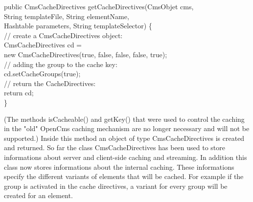 \begin{java}
public  CmsCacheDirectives getCacheDirectives(CmsObjet cms,\\
\jtabb		String templateFile, String elementName,\\
\jtabb 		Hashtable parameters, String templateSelector) \{\\
\jtaba 		// create a CmsCacheDirectives object:\\
\jtaba 		CmsCacheDirectives cd = \\
\jtabb 			new CmsCacheDirectives(true, false, false, false, true);\\
\jtaba		// adding the group to the cache key:\\
\jtaba		cd.setCacheGroups(true);\\
\jtaba		// return the CacheDirectives:\\
\jtaba		return cd;\\
\}\\
\end{java}


(The methods {\meth isCacheable()}  
and {\meth getKey()} that were used to control the caching in 
the "old" OpenCms caching mechanism are no longer necessary and will not be supported.) 
Inside this method an object of type {\class CmsCacheDirectives} is created and returned. 
So far the class {\class CmsCacheDirectives} has been used to store informations about server 
and client-side caching and streaming. In addition this class now stores informations 
about the internal caching. These informations specify the different variants of elements 
that will be cached. For example if the group is activated in the cache directives, 
a variant for every group will be created for an element.

